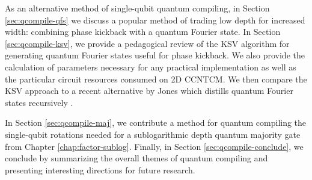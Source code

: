 As an alternative method of single-qubit quantum compiling,
in Section \ref{sec:qcompile-qfs} we
discuss a popular method of trading low depth for increased
width: combining phase kickback with a quantum Fourier state.
In Section \ref{sec:qcompile-ksv}, we provide a pedagogical review
of the KSV algorithm for generating quantum Fourier states
useful for phase kickback. We also provide the calculation of
parameters necessary for any practical implementation as well as
the particular circuit resources consumed on \textsf{2D CCNTCM}.
We then compare the KSV approach to a recent alternative
by Jones which distills quantum Fourier states recursively \cite{Jones2013}.

In Section \ref{sec:qcompile-maj}, we contribute a method for
quantum compiling the single-qubit rotations needed for a
sublogarithmic depth quantum majority gate from Chapter \ref{chap:factor-sublog}.
Finally, in Section \ref{sec:qcompile-conclude}, we conclude by summarizing
the overall themes of quantum compiling and presenting interesting
directions for future research.

















